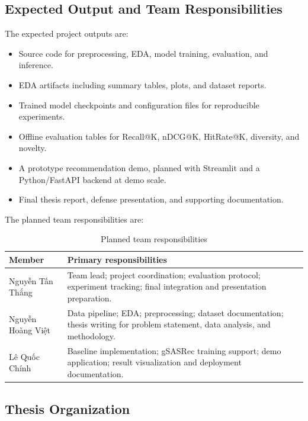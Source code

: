 \subsection{Expected Output and Team Responsibilities}

The expected project outputs are:

\begin{itemize}
    \item Source code for preprocessing, EDA, model training, evaluation, and inference.
    \item EDA artifacts including summary tables, plots, and dataset reports.
    \item Trained model checkpoints and configuration files for reproducible experiments.
    \item Offline evaluation tables for Recall@K, nDCG@K, HitRate@K, diversity, and novelty.
    \item A prototype recommendation demo, planned with Streamlit and a Python/FastAPI backend at demo scale.
    \item Final thesis report, defense presentation, and supporting documentation.
\end{itemize}

The planned team responsibilities are:

\begin{table}[H]
    \centering
    \caption{Planned team responsibilities}
    \label{tab:team-responsibilities}
    \begin{tabular}{p{4cm} p{9cm}}
        \toprule
        \textbf{Member} & \textbf{Primary responsibilities} \\
        \midrule
        Nguyễn Tấn Thắng & Team lead; project coordination; evaluation protocol; experiment tracking; final integration and presentation preparation. \\
        Nguyễn Hoàng Việt & Data pipeline; EDA; preprocessing; dataset documentation; thesis writing for problem statement, data analysis, and methodology. \\
        Lê Quốc Chính & Baseline implementation; gSASRec training support; demo application; result visualization and deployment documentation. \\
        \bottomrule
    \end{tabular}
\end{table}

\subsection{Thesis Organization}

